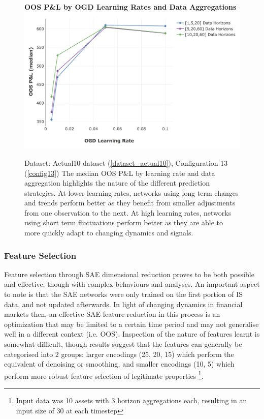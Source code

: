 \documentclass[a4paper,11pt,oneside]{article}
\theoremstyle{plain}
\theoremstyle{definition}
\begin{document}
	\begin{figure}[H]
		\textbf{OOS P\&L by OGD Learning Rates and Data Aggregations}
		\centering
		\includegraphics[scale=0.45]{images/results/primary/OOS_OGDLR_Delta_PL_median.png}
		\caption[OOS P\&L by OGD Learning Rates and Data Aggregations]
		{Dataset: Actual10 dataset (\ref{dataset_actual10}), Configuration 13 (\ref{config13})
			\newline The median OOS P\&L by learning rate and data aggregation highlights the nature of the different prediction strategies. At lower learning rates, networks using long term changes and trends perform better as they benefit from smaller adjustments from one observation to the next. At high learning rates, networks using short term fluctuations perform better as they are able to more quickly adapt to changing dynamics and signals.}
		\label{figure-actual_ogd_lr_data}
	\end{figure}
	
	\subsubsection{Feature Selection}
	
	Feature selection through SAE dimensional reduction proves to be both possible and effective, though with complex behaviours and analyses. An important aspect to note is that the SAE networks were only trained on the first portion of IS data, and not updated afterwards. In light of changing dynamics in financial markets then, an effective SAE feature reduction in this process is an optimization that may be limited to a certain time period and may not generalise well in a different context (i.e. OOS). Inspection of the nature of features learnt is somewhat difficult, though results suggest that the features can generally be categorised into 2 groups: larger encodings (25, 20, 15) which perform the equivalent of denoising or smoothing, and smaller encodings (10, 5) which perform more robust feature selection of legitimate properties   \footnote{Input data was 10 assets with 3 horizon aggregations each, resulting in an input size of 30 at each timestep}.\newline
\end{document}
